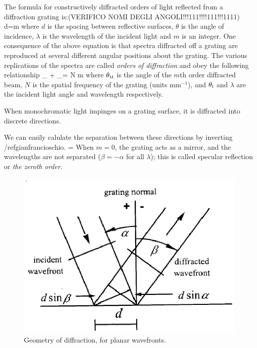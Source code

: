 The formula for constructively diffracted orders of light reflected from a diffraction grating is:(VERIFICO NOMI DEGLI ANGOLI!!!111!!!!111!!!1111)
\mate
d\sin\theta=m\lambda
\label{gianfrancioschio}
\atem
where $d$ is the spacing between reflective surfaces, $\theta$ is the angle of incidence, $\lambda$ is the wavelength of the incident light and $m$ is an integer. One consequence of the above equation is that spectra diffracted off a grating are reproduced at several different angular positions about the grating. The various replications of the spectra are called \textit{orders of diffraction} and obey the following relationship 
\mate
\sin\theta_{} + \sin\theta_{}= N m \lambda
\atem
where $\theta_{\mbox{\footnotesize{\scshape{m}}}}$ is the angle of the $m$th order diffracted beam, $N$ is the spatial frequency of the grating (units mm$^{-1}$), and $\theta_{\mbox{\footnotesize{\scshape{i}}}}$ and $\lambda$ are the incident light angle and wavelength respectively.



When monochromatic light impinges on a grating surface, it is diffracted into discrete directions.

We can easily calulate the  separation between these directions by inverting /ref{gianfrancioschio}.
\mate
\beta[\lambda]=\arcsin{}
\atem
When $m=0$, the grating acts as a mirror, and the wavelengths are not separated ($\beta=-\alpha$ for all $\lambda$); this is called specular reflection or \textit{the zeroth order}. 
\begin{figure}[!htb]\centering
\includegraphics[width=\linewidth, draft=\foto]{eps/littrow4.eps}
\caption{Geometry of diffraction, for planar wavefronts.}
\label{littrow4}
\end{figure}




